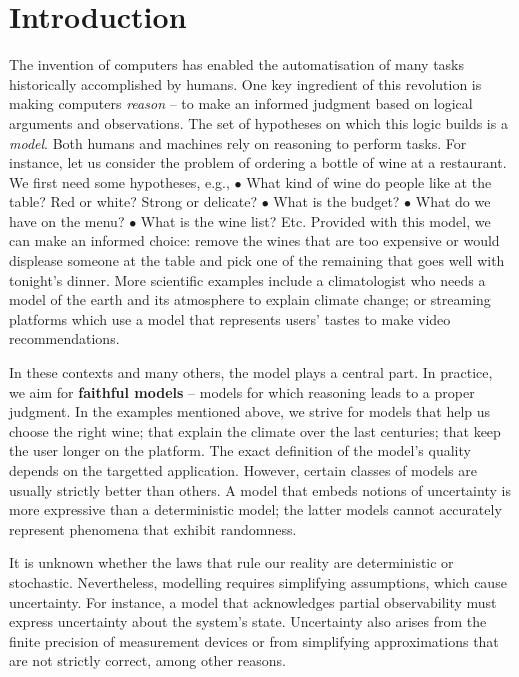 
\section{Introduction}
The invention of computers has enabled the automatisation of many tasks historically accomplished by humans. One key ingredient of this revolution is making computers \textit{reason} -- to make an informed judgment based on logical arguments and observations. The set of hypotheses on which this logic builds is a \textit{model}. Both humans and machines rely on reasoning to perform tasks. For instance, let us consider the problem of ordering a bottle of wine at a restaurant. We first need some hypotheses, e.g., $\bullet$ What kind of wine do people like at the table? Red or white? Strong or delicate? $\bullet$ What is the budget? $\bullet$ What do we have on the menu? $\bullet$ What is the wine list? Etc. Provided with this model, we can make an informed choice: remove the wines that are too expensive or would displease someone at the table and pick one of the remaining that goes well with tonight's dinner. More scientific examples include a climatologist who needs a model of the earth and its atmosphere to explain climate change; or streaming platforms which use a model that represents users' tastes to make video recommendations.

In these contexts and many others, the model plays a central part. In practice, we aim for \textbf{faithful models} -- models for which reasoning leads to a proper judgment. In the examples mentioned above, we strive for models that help us choose the right wine; that explain the climate over the last centuries; that keep the user longer on the platform. The exact definition of the model's quality depends on the targetted application. However, certain classes of models are usually strictly better than others. A model that embeds notions of uncertainty is more expressive than a deterministic model; the latter models cannot accurately represent phenomena that exhibit randomness.

It is unknown whether the laws that rule our reality are deterministic or stochastic. Nevertheless, modelling requires simplifying assumptions, which cause uncertainty. For instance, a model that acknowledges partial observability must express uncertainty about the system's state. Uncertainty also arises from the finite precision of measurement devices or from simplifying approximations that are not strictly correct, among other reasons.

